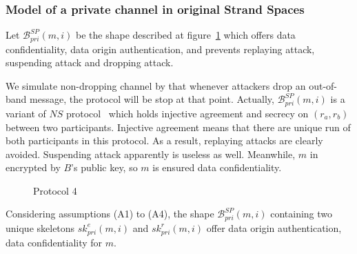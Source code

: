 \subsubsection*{Model of a private channel in original Strand Spaces}\label{private}

Let $\mathcal{B}^{SP}_{pri}(m,i)$ be the shape described at figure~\ref{protocol4} which offers data confidentiality, data origin authentication, and prevents replaying attack, suspending attack and dropping attack.

We simulate non-dropping channel by that whenever attackers drop an out-of-band message, the protocol will be stop at that point. Actually, $\mathcal{B}^{SP}_{pri}(m,i)$ is a variant of $NS$ protocol~\cite{674832} which holds injective agreement and secrecy on $(r_a,r_b)$ between two participants. Injective agreement means that there are unique run of both participants in this protocol. As a result, replaying attacks are clearly avoided. Suspending attack apparently is useless as well. Meanwhile, $m$ in encrypted by $B$'s public key, so $m$ is ensured data confidentiality. 

\begin{figure}
\begin{center}
\end{center}
\caption{Protocol 4} 
\label{protocol4}
\end{figure}

\begin{Proposition}
Considering assumptions (A1) to (A4), the shape $\mathcal{B}^{SP}_{pri}(m,i)$ containing two unique skeletons $sk^e_{pri}(m,i)$ and $sk^r_{pri}(m,i)$ offer data origin authentication, data confidentiality for $m$.   
\end{Proposition}

